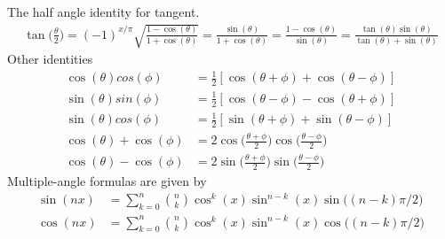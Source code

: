 The half angle identity for tangent.
\begin{align}
\tan\bigg(\frac{\theta}{2}\bigg)=(-1)^{x/\pi}\sqrt{\frac{1-\cos(\theta)}{1+\cos(\theta)}} = \frac{\sin(\theta)}{1+\cos(\theta)}=\frac{1-\cos(\theta)}{\sin(\theta)}=\frac{\tan(\theta)\sin(\theta)}{\tan(\theta)+\sin(\theta)}
\end{align}
Other identities
\begin{align}
\cos(\theta)cos(\phi) &=\frac{1}{2}[\cos(\theta+\phi)+\cos(\theta-\phi)] \\
\sin(\theta)sin(\phi) &=\frac{1}{2}[\cos(\theta-\phi)-\cos(\theta+\phi)] \\
\sin(\theta)cos(\phi) &=\frac{1}{2}[\sin(\theta+\phi)+\sin(\theta-\phi)] \\
\cos(\theta)+\cos(\phi)&= 2\cos\bigg( \frac{\theta+\phi}{2}\bigg)\cos\bigg( \frac{\theta-\phi}{2}\bigg) \\
\cos(\theta)-\cos(\phi)&= 2\sin\bigg( \frac{\theta+\phi}{2}\bigg)\sin\bigg( \frac{\theta-\phi}{2}\bigg)
\end{align}
Multiple-angle formulas are given by 
\begin{align}
\sin(nx)&= \sum_{k=0}^{n}{{n}\choose{k}}\cos^k(x)\sin^{n-k}(x)\sin\big((n-k)\pi/2 \big) \\
\cos(nx)&= \sum_{k=0}^{n}{{n}\choose{k}}\cos^k(x)\sin^{n-k}(x)\cos\big((n-k)\pi/2 \big)
\end{align}









